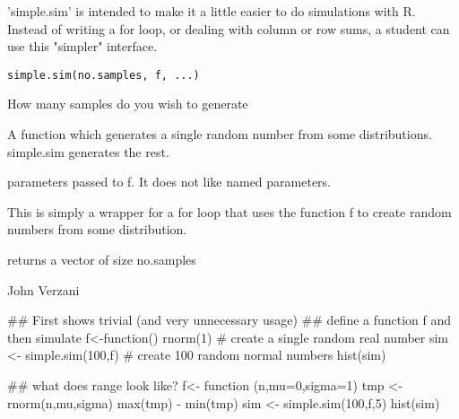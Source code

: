 \begin{Description}\relax
'simple.sim' is intended to make it a little easier to do simulations
with R. Instead of writing a for loop, or dealing with column or row
sums, a student can use this "simpler" interface.
\end{Description}
\begin{Usage}
\begin{verbatim}
simple.sim(no.samples, f, ...)
\end{verbatim}
\end{Usage}
\begin{Arguments}
\begin{ldescription}
\item[\code{no.samples}] How many samples do you wish to generate 
\item[\code{f}] A function which generates a single random number from some
distributions. simple.sim generates the rest.
\item[\code{...}] parameters passed to f. It does not like named parameters.
\end{ldescription}
\end{Arguments}
\begin{Details}\relax
This is simply a wrapper for a for loop that uses the function f to
create random numbers from some distribution.
\end{Details}
\begin{Value}
returns a vector of size no.samples
\end{Value}
\begin{Author}\relax
John Verzani
\end{Author}
\begin{Examples}
\begin{ExampleCode}
## First shows trivial (and very unnecessary usage)
## define a function f and then simulate
f<-function() rnorm(1)     # create a single random real number
sim <- simple.sim(100,f)   # create 100 random normal numbers
hist(sim)

## what does range look like?
f<- function (n,mu=0,sigma=1) {
  tmp <- rnorm(n,mu,sigma)
  max(tmp) - min(tmp)
}
sim <- simple.sim(100,f,5)
hist(sim)
\end{ExampleCode}
\end{Examples}

